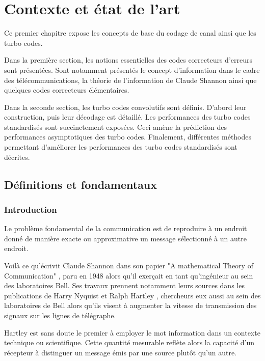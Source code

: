 
\chapter{Contexte et état de l'art}
Ce premier chapitre expose les concepts de base du codage de canal ainsi que les turbo codes.

Dans la première section, les notions essentielles des codes correcteurs d'erreurs sont présentées. Sont notamment 
présentés le concept 
d'information dans le cadre des télécommunications, la théorie de l'information de Claude Shannon ainsi que
quelques codes correcteurs élémentaires.

Dans la seconde section, les turbo codes convolutifs sont définis. D'abord leur construction, puis leur décodage est 
détaillé. 
Les performances des turbo codes standardisés sont succinctement exposées. Ceci amène la prédiction des performances 
asymptotiques des turbo codes. Finalement, différentes méthodes permettant d'améliorer les performances des turbo codes 
standardisés sont décrites. 

\vspace*{\fill}
\minitocTITI
\vspace*{\fill}

\section{Définitions et fondamentaux}

\subsection{Introduction}
\og Le problème fondamental de la communication est de reproduire à un endroit donné de manière exacte ou approximative 
un message sélectionné à un autre endroit.\fg

Voilà ce qu'écrivit Claude Shannon dans son papier "A mathematical Theory of Communication" \cite{shannon_mathematical_2001}, 
paru en 1948 alors qu'il exerçait en tant qu'ingénieur au sein des laboratoires Bell. Ses travaux prennent notamment 
leurs sources dans les publications de Harry Nyquist \cite{nyquist_telegraph} et Ralph Hartley \cite{hartley_trans}, 
chercheurs eux aussi au sein des laboratoires de Bell alors qu'ils visent à augmenter la vitesse de transmission des signaux sur 
les lignes de télégraphe. 

Hartley est sans doute le premier à employer le mot information dans un contexte technique ou scientifique. Cette 
quantité mesurable reflète alors la capacité d'un récepteur à distinguer un message émis par une 
source plutôt qu'un autre.

